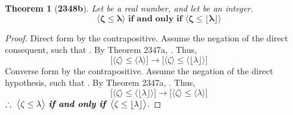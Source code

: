 \documentclass[preview]{standalone}
\newtheorem*{theorem*}{Theorem}
\begin{document}
\begin{theorem*}[\textbf{2348b}]
    Let \bm{$\lambda$} be a real number, 
    and let \bm{$\zeta$} be an integer. 
    \begin{equation*}
        \bm{
        \big \langle \zeta \le \lambda \big \rangle
            \textbf{ if and only if }
        \big \langle \zeta \le \lfloor \lambda \rfloor \big \rangle}
    \end{equation*}
\end{theorem*}

\begin{proof}
    Direct form by the contrapositive.
    Assume the negation of the direct consequent,
    such that \bm{$\zeta > \lfloor \lambda \rfloor$}.
    By Theorem 2347a, \bm{$\zeta > \lambda$}.
    Thus,
    \begin{equation*}
        \bigg[
            \Big \langle \zeta \Big \rangle
                \leq 
            \Big \langle \lambda \Big \rangle
        \bigg]
            \rightarrow 
        \bigg[
            \Big \langle \zeta \Big \rangle
                \leq 
            \Big \langle \lfloor \lambda \rfloor \Big \rangle
        \bigg]
    \end{equation*}
    Converse form by the contrapositive.
    Assume the negation of the direct hypothesis,
    such that \bm{$\zeta > \lambda$}.
    By Theorem 2347a, 
    \bm{$\zeta > \lfloor \lambda \rfloor$}.
    Thus,
    \begin{equation*}
        \bigg[
            \Big \langle \zeta \Big \rangle
                \leq 
            \Big \langle \lfloor \lambda \rfloor \Big \rangle
        \bigg]
            \rightarrow 
        \bigg[
            \Big \langle \zeta \Big \rangle
                \leq 
            \Big \langle \lambda \Big \rangle
        \bigg]
    \end{equation*}
    $\therefore \text{\space} \relax{
        \big \langle \zeta \le \lambda \big \rangle
            \textbf{ \emph{if and only if} }
        \big \langle \zeta \le \lfloor \lambda \rfloor \big \rangle}
    $.
\color{lightgray} \end{proof}
\end{document}

